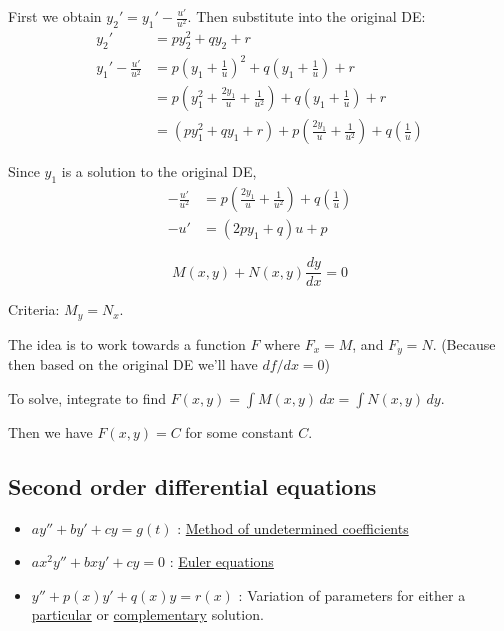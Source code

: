 \begin{compute}
  First we obtain $\displaystyle y_2'=y_1'-\frac{u'}{u^2}$. Then substitute into the original DE:
  \begin{align*}
    y_2' &= py_2^2+qy_2+r                                                                  \\
    y_1'-\frac{u'}{u^2}
         &= p\left(y_1+\frac1u\right)^2+q\left(y_1+\frac1u\right)+r                        \\
         &= p\left(y_1^2+\frac{2y_1}{u}+\frac1{u^2}\right)+q\left(y_1+\frac1u\right)+r     \\
         &= (py_1^2+qy_1+r)+p\left(\frac{2y_1}{u}+\frac1{u^2}\right)+q\left(\frac1u\right)
  \end{align*}

  Since $y_1$ is a solution to the original DE,
  \begin{align*}
    -\frac{u'}{u^2} &= p\left(\frac{2y_1}{u}+\frac1{u^2}\right)+q\left(\frac1u\right) \\
    -u'             &=(2py_1+q)u+p
  \end{align*}
\end{compute}

\label{db2397c}

$$
  M(x,y)+N(x,y)\frac{dy}{dx}=0
$$

Criteria: $M_y=N_x$.

The idea is to work towards a function $F$ where $F_x=M$, and $F_y=N$. (Because
then based on the original DE we'll have $df/dx=0$)

To solve, integrate to find $F(x,y)=\int M(x,y)\,dx=\int N(x,y)\,dy$.

Then we have $F(x,y)=C$ for some constant $C$.

\subsection{Second order differential equations}\label{b07a82f}

\begin{itemize}
  \item $ay''+by'+cy=g(t)$ : \href{af8932c}{Method of undetermined
        coefficients}
  \item $ax^2y''+bxy'+cy=0$ : \href{c15a777}{Euler equations}
  \item $y''+p(x)y'+q(x)y=r(x)$ : Variation of parameters for either a
        \href{cc51fcb}{particular} or
        \href{d359b97}{complementary} solution.
\end{itemize}

